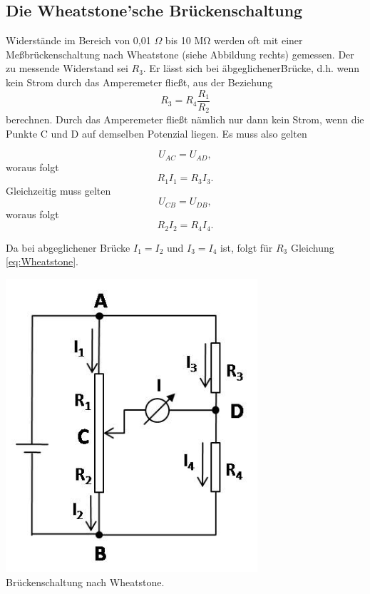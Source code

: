 \subsection{Die Wheatstone'sche Brückenschaltung} \label{chap:Wheatstone}

Widerstände im Bereich von 0,01 $\Omega$ bis 10 M$\mathrm{\Omega}$ werden oft mit einer Meßbrückenschaltung nach Wheatstone (siehe Abbildung rechts) gemessen. Der zu messende Widerstand sei $R_3$. Er lässt sich bei \"abgeglichener\" Brücke, d.h. wenn kein Strom durch das Amperemeter fließt, aus der Beziehung
\begin{equation}
 R_3 = R_4\frac{R_1}{R_2}
 \label{eq:Wheatstone}
\end{equation}
berechnen. Durch das Amperemeter fließt nämlich nur dann kein Strom, wenn die Punkte C und D auf demselben Potenzial liegen. Es muss also gelten

\begin{minipage}[b]{0.5\textwidth}
\begin{equation}
 U_{AC} = U_{AD},
\end{equation}
woraus folgt
\begin{equation}
 R_1 I_1 = R_3 I_3.
\end{equation}
Gleichzeitig muss gelten
\begin{equation}
 U_{CB} = U_{DB},
\end{equation}
woraus folgt
\begin{equation}
 R_2 I_2 = R_4 I_4.
\end{equation}

Da bei abgeglichener Brücke $I_1 = I_2$ und $I_3 = I_4$ ist, folgt für $R_3$ Gleichung \ref{eq:Wheatstone}.
\end{minipage}
%
\begin{minipage}[b]{0.5\textwidth}
 \centering
 \includegraphics[width=0.7\textwidth]{Abbildungen/Wheatstone_Prinzip.jpg}\\
 Brückenschaltung nach Wheatstone.
\end{minipage}

